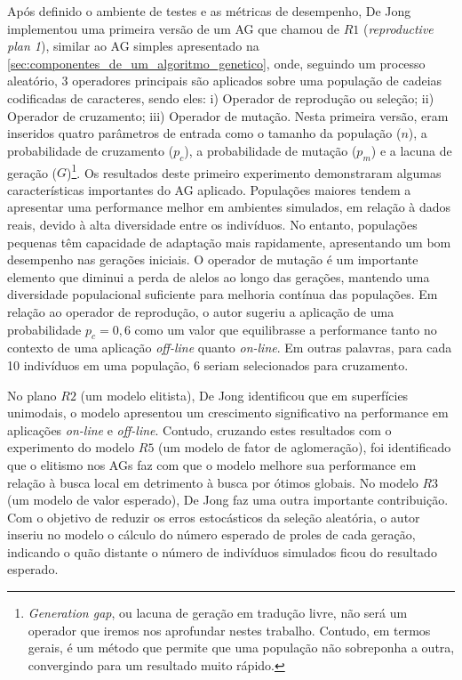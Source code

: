 Após definido o ambiente de testes e as métricas de desempenho, De Jong implementou uma primeira versão de um AG que chamou de $R1$ (\textit{reproductive plan 1}), similar ao AG simples apresentado na \autoref{sec:componentes_de_um_algoritmo_genetico}, onde, seguindo um processo aleatório, 3 operadores principais são aplicados sobre uma população de cadeias codificadas de caracteres, sendo eles: i) Operador de reprodução ou seleção; ii) Operador de cruzamento; iii) Operador de mutação. Nesta primeira versão, eram inseridos quatro parâmetros de entrada como o tamanho da população ($n$), a probabilidade de cruzamento ($p_c$), a probabilidade de mutação ($p_m$) e a lacuna de geração ($G$)\footnote{\textit{Generation gap}, ou lacuna de geração em tradução livre, não será um operador que iremos nos aprofundar nestes trabalho. Contudo, em termos gerais, é um método que permite que uma população não sobreponha a outra, convergindo para um resultado muito rápido.}. Os resultados deste primeiro experimento demonstraram algumas características importantes do AG aplicado. Populações maiores tendem a apresentar uma performance melhor em ambientes simulados, em relação à dados reais, devido à alta diversidade entre os indivíduos. No entanto, populações pequenas têm capacidade de adaptação mais rapidamente, apresentando um bom desempenho nas gerações iniciais. O operador de mutação é um importante elemento que diminui a perda de alelos ao longo das gerações, mantendo uma diversidade populacional suficiente para melhoria contínua das populações. Em relação ao operador de reprodução, o autor sugeriu a aplicação de uma probabilidade $p_c = 0,6$ como um valor que equilibrasse a performance tanto no contexto de uma aplicação \textit{off-line} quanto \textit{on-line}. Em outras palavras, para cada 10 indivíduos em uma população, 6 seriam selecionados para cruzamento.

No plano $R2$ (um modelo elitista), De Jong identificou que em superfícies unimodais, o modelo apresentou um crescimento significativo na performance em aplicações \textit{on-line} e \textit{off-line}. Contudo, cruzando estes resultados com o experimento do modelo $R5$ (um modelo de fator de aglomeração), foi identificado que o elitismo nos AGs faz com que o modelo melhore sua performance em relação à busca local em detrimento à busca por ótimos globais. No modelo $R3$ (um modelo de valor esperado), De Jong faz uma outra importante contribuição. Com o objetivo de reduzir os erros estocásticos da seleção aleatória, o autor inseriu no modelo o cálculo do número esperado de proles de cada geração, indicando o quão distante o número de indivíduos simulados ficou do resultado esperado.

